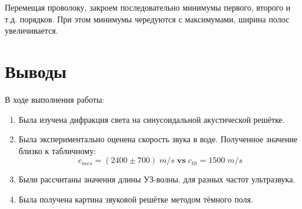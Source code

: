 \documentclass{article}
\begin{document}
Перемещая проволоку, закроем последовательно минимумы первого, второго и т.д.
порядков. При этом минимумы чередуются с максимумами, ширина полос увеличивается.

\section{Выводы}
В ходе выполнения работы:
\begin{enumerate}
  \item Была изучена дифракция света на синусоидальной акустической решётке.
  \item Была экспериментально оценена скорость звука в воде. Полученное значение
  близко к табличному:
  \[ c_{mes} = (2400 \pm 700)\; m/s\; \textbf{vs}\; c_{th} = 1500\; m/s \]
  \item Были рассчитаны значения длины УЗ-волны. для разных частот ультразвука.
  \item Была получена картина звуковой решётке методом тёмного поля.
\end{enumerate}
\end{document}
